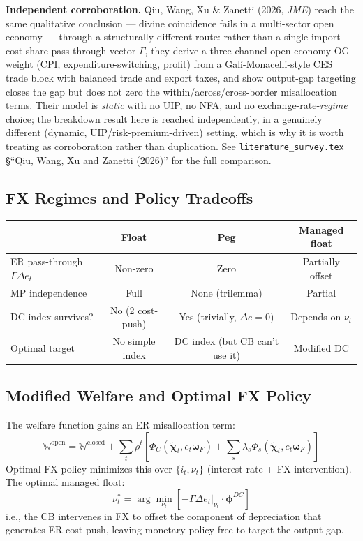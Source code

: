 \documentclass[12pt]{article}
\begin{document}
\begin{insight}
\textbf{Independent corroboration.} Qiu, Wang, Xu \& Zanetti (2026, \textit{JME}) reach the same qualitative conclusion --- divine coincidence fails in a multi-sector open economy --- through a structurally different route: rather than a single import-cost-share pass-through vector $\Gamma$, they derive a three-channel open-economy OG weight (CPI, expenditure-switching, profit) from a Galí-Monacelli-style CES trade block with balanced trade and export taxes, and show output-gap targeting closes the gap but does not zero the within/across/cross-border misallocation terms. Their model is \emph{static} with no UIP, no NFA, and no exchange-rate-\emph{regime} choice; the breakdown result here is reached independently, in a genuinely different (dynamic, UIP/risk-premium-driven) setting, which is why it is worth treating as corroboration rather than duplication. See \texttt{literature\_survey.tex} \S``Qiu, Wang, Xu and Zanetti (2026)'' for the full comparison.
\end{insight}

\subsection{FX Regimes and Policy Tradeoffs}

\begin{center}
\begin{tabular}{lccc}
\toprule
& \textbf{Float} & \textbf{Peg} & \textbf{Managed float} \\
\midrule
ER pass-through $\Gamma\Delta e_t$ & Non-zero & Zero & Partially offset \\
MP independence & Full & None (trilemma) & Partial \\
DC index survives? & No (2 cost-push) & Yes (trivially, $\Delta e=0$) & Depends on $\nu_t$ \\
Optimal target & No simple index & DC index (but CB can't use it) & Modified DC \\
\bottomrule
\end{tabular}
\end{center}

\subsection{Modified Welfare and Optimal FX Policy}

The welfare function gains an ER misallocation term:
\begin{equation}
    \mathbb{W}^{\mathrm{open}} = \mathbb{W}^{\mathrm{closed}} + \sum_t \rho^t \left[\Phi_C(\tilde{\bm{\chi}}_t, e_t\bm{\omega}_F) + \sum_s\lambda_s\Phi_s(\tilde{\bm{\chi}}_t, e_t\bm{\omega}_F)\right]
\end{equation}
Optimal FX policy minimizes this over $\{i_t, \nu_t\}$ (interest rate + FX intervention). The optimal managed float:
\begin{equation}
    \nu_t^* = \arg\min_{\nu_t}\left[-\Gamma\Delta e_t\bigg|_{\nu_t}\cdot\bm{\phi}^{DC}\right]
\end{equation}
i.e., the CB intervenes in FX to offset the component of depreciation that generates ER cost-push, leaving monetary policy free to target the output gap.
\end{document}
